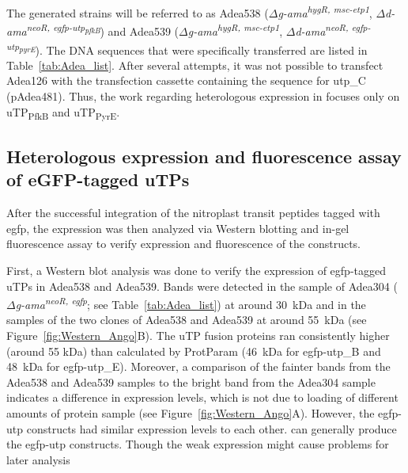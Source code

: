 \par The generated strains will be referred to as Adea538 ($\Delta$\textit{\gls{g-ama}\textsuperscript{hygR, msc-etp1}}, $\Delta$\textit{\gls{d-ama}\textsuperscript{neoR, egfp-utp\textsubscript{pfkB}}}) and Adea539 ($\Delta$\textit{\gls{g-ama}\textsuperscript{hygR, msc-etp1}}, $\Delta$\textit{\gls{d-ama}\textsuperscript{neoR, egfp-utp\textsubscript{pyrE}}}). The DNA sequences that were specifically transferred are listed in Table~\ref{tab:Adea_list}. After several attempts, it was not possible to transfect Adea126 with the transfection cassette containing the sequence for \gls{utp_C} (pAdea481). Thus, the work regarding heterologous expression in  focuses only on uTP\textsubscript{PfkB} and uTP\textsubscript{PyrE}.

\subsection{Heterologous expression and fluorescence assay of eGFP-tagged uTPs}
After the successful integration of the nitroplast transit peptides tagged with \gls{egfp}, the expression was then analyzed via Western blotting and in-gel fluorescence assay to verify expression and fluorescence of the constructs. 

\par First, a Western blot analysis was done to verify the expression of \gls{egfp}-tagged uTPs in Adea538 and Adea539. Bands were detected in the sample of Adea304 ($\Delta$\textit{\gls{g-ama}\textsuperscript{neoR, egfp}}; see Table~\ref{tab:Adea_list}) at around 30~kDa and in the samples of the two clones of Adea538 and Adea539 at around 55~kDa (see Figure~\ref{fig:Western_Ango}B). The uTP fusion proteins ran consistently higher (around 55 kDa) than calculated by ProtParam (46~kDa for \gls{egfp}-\gls{utp_B} and 48~kDa for \gls{egfp}-\gls{utp_E}). Moreover, a comparison of the fainter bands from the Adea538 and Adea539 samples to the bright band from the Adea304 sample indicates a difference in expression levels, which is not due to loading of different amounts of protein sample (see Figure~\ref{fig:Western_Ango}A). However, the \gls{egfp}-\gls{utp} constructs had similar expression levels to each other.  can generally produce the \gls{egfp}-\gls{utp} constructs. Though the weak expression might cause problems for later analysis  

